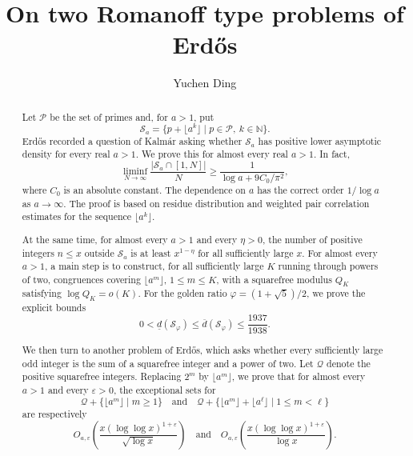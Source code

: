 \documentclass[11pt,reqno]{amsart}
\title[On two Romanoff type problems of Erd\H{o}s]
{On two Romanoff type problems of Erd\H{o}s}
\author[Y. Ding]{Yuchen Ding}
\numberwithin{equation}{section}
\begin{document}
    \begin{abstract}
        Let $\mathcal{P}$ be the set of primes and, for $a>1$, put
        $$
        \mathcal{S}_a=\{p+\lfloor a^k\rfloor\mid p\in\mathcal{P},\ k\in\mathbb{N}\}.
        $$
        Erd\H{o}s recorded a question of Kalm\'ar asking whether $\mathcal{S}_a$ has positive lower asymptotic density for every real $a>1$. We prove this for almost every real $a>1$. In fact,
        $$
        \liminf_{N\to\infty}\frac{|\mathcal{S}_a\cap[1,N]|}{N}
        \ge \frac{1}{\log a+9C_0/\pi^2},
        $$
        where $C_0$ is an absolute constant. The dependence on $a$ has the correct order $1/\log a$ as $a\to\infty$. The proof is based on residue distribution and weighted pair correlation estimates for the sequence $\lfloor a^k\rfloor$.

        At the same time, for almost every $a>1$ and every $\eta>0$, the number of positive integers $n\le x$ outside $\mathcal{S}_a$ is at least $x^{1-\eta}$ for all sufficiently large $x$. For almost every $a>1$, a main step is to construct, for all sufficiently large $K$ running through powers of two, congruences covering $\lfloor a^m\rfloor$, $1\le m\le K$, with a squarefree modulus $Q_K$ satisfying $\log Q_K=o(K)$. For the golden ratio $\varphi=(1+\sqrt5)/2$, we prove the explicit bounds
        $$
        0<\underline d(\mathcal{S}_\varphi)\le \overline d(\mathcal{S}_\varphi)\le \frac{1937}{1938}.
        $$

        We then turn to another problem of Erd\H{o}s, which asks whether every sufficiently large odd integer is the sum of a squarefree integer and a power of two. Let $\mathcal{Q}$ denote the positive squarefree integers. Replacing $2^m$ by $\lfloor a^m\rfloor$, we prove that for almost every $a>1$ and every $\varepsilon>0$, the exceptional sets for
        $$
        \mathcal{Q}+\{\lfloor a^m\rfloor\mid m\ge1\}
        \quad\text{and}\quad
        \mathcal{Q}+\{\lfloor a^m\rfloor+\lfloor a^\ell\rfloor\mid 1\le m<\ell\}
        $$
        are respectively
        $$
        O_{a,\varepsilon}\!\left(\frac{x(\log\log x)^{1+\varepsilon}}{\sqrt{\log x}}\right)
        \quad\text{and}\quad
        O_{a,\varepsilon}\!\left(\frac{x(\log\log x)^{1+\varepsilon}}{\log x}\right).
        $$
    \end{abstract}

    \maketitle
\end{document}
